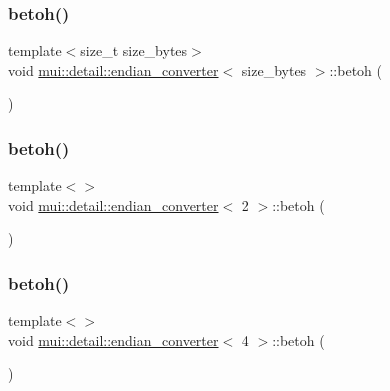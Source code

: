 \subsubsection{\texorpdfstring{betoh()}{betoh()}\hspace{0.1cm}{\footnotesize\ttfamily [1/4]}}
{\footnotesize\ttfamily template$<$size\+\_\+t size\+\_\+bytes$>$ \\
void \hyperlink{structmui_1_1detail_1_1endian__converter}{mui\+::detail\+::endian\+\_\+converter}$<$ size\+\_\+bytes $>$\+::betoh (\begin{DoxyParamCaption}{ }\end{DoxyParamCaption})}

\mbox{\label{structmui_1_1detail_1_1endian__converter_ab0f14ea48f1d5a0d961a9a971f693c45}} 
\subsubsection{\texorpdfstring{betoh()}{betoh()}\hspace{0.1cm}{\footnotesize\ttfamily [2/4]}}
{\footnotesize\ttfamily template$<$$>$ \\
void \hyperlink{structmui_1_1detail_1_1endian__converter}{mui\+::detail\+::endian\+\_\+converter}$<$ 2 $>$\+::betoh (\begin{DoxyParamCaption}{ }\end{DoxyParamCaption})\hspace{0.3cm}{\ttfamily [inline]}}

\mbox{\label{structmui_1_1detail_1_1endian__converter_a8d4f028749a475d3f22350ebf34c0499}} 
\subsubsection{\texorpdfstring{betoh()}{betoh()}\hspace{0.1cm}{\footnotesize\ttfamily [3/4]}}
{\footnotesize\ttfamily template$<$$>$ \\
void \hyperlink{structmui_1_1detail_1_1endian__converter}{mui\+::detail\+::endian\+\_\+converter}$<$ 4 $>$\+::betoh (\begin{DoxyParamCaption}{ }\end{DoxyParamCaption})\hspace{0.3cm}{\ttfamily [inline]}}


